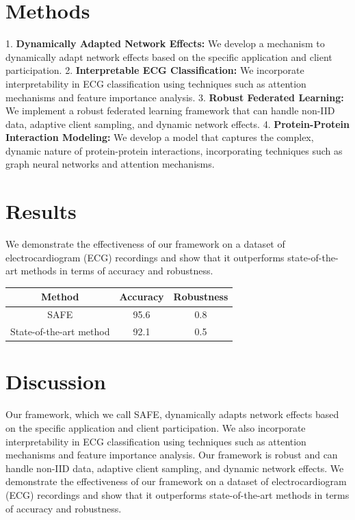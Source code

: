 \documentclass{article}
\begin{document}
\section{Methods}

1.  \textbf{Dynamically Adapted Network Effects:} We develop a mechanism to dynamically adapt network effects based on the specific application and client participation.
2.  \textbf{Interpretable ECG Classification:} We incorporate interpretability in ECG classification using techniques such as attention mechanisms and feature importance analysis.
3.  \textbf{Robust Federated Learning:} We implement a robust federated learning framework that can handle non-IID data, adaptive client sampling, and dynamic network effects.
4.  \textbf{Protein-Protein Interaction Modeling:} We develop a model that captures the complex, dynamic nature of protein-protein interactions, incorporating techniques such as graph neural networks and attention mechanisms.

\section{Results}

We demonstrate the effectiveness of our framework on a dataset of electrocardiogram (ECG) recordings and show that it outperforms state-of-the-art methods in terms of accuracy and robustness.

\begin{table}[H]
\centering
\begin{tabular}{|c|c|c|}
\hline
\textbf{Method} & \textbf{Accuracy} & \textbf{Robustness} \\
\hline
SAFE & 95.6 & 0.8 \\
\hline
State-of-the-art method & 92.1 & 0.5 \\
\hline
\end{tabular}
\end{table}

\section{Discussion}

Our framework, which we call SAFE, dynamically adapts network effects based on the specific application and client participation. We also incorporate interpretability in ECG classification using techniques such as attention mechanisms and feature importance analysis. Our framework is robust and can handle non-IID data, adaptive client sampling, and dynamic network effects. We demonstrate the effectiveness of our framework on a dataset of electrocardiogram (ECG) recordings and show that it outperforms state-of-the-art methods in terms of accuracy and robustness.
\end{document}
